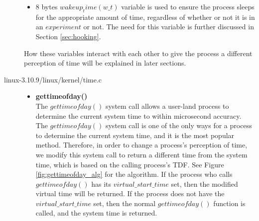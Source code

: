 \begin{description}
\begin{itemize}
	\item 8 bytes $wakeup_time (w\_t)$ variable is used to ensure the process sleeps for the appropriate amount of time, regardless of whether or not it is in an $experiment$ or not. The need for this variable is further discussed in Section \ref{sec:hooking}.
        \end{itemize}
        How these variables interact with each other to give the process a different perception of time will be explained in later sections. 
\item[linux-3.10.9/linux/kernel/time.c] \hfill 
        \begin{itemize} 
                        \item \textbf{gettimeofday()} \\
                        The $gettimeofday()$ system call allows a user-land process to determine the current system time to within microsecond accuracy. The $gettimeofday()$ system call is one of the only ways for a process to determine the current system time, and it is the most popular method. Therefore, in order to change a process's perception of time, we modify this system call to return a different time from the system time, which is based on the calling process's TDF. See Figure \ref{fig:gettimeofday_alg} for the algorithm. If the process who calls $gettimeofday()$ has its $virtual\_start\_time$ set, then the modified virtual time will be returned. If the process does not have the $virtual\_start\_time$ set, then the normal $gettimeofday()$ function is called, and the system time is returned. \\ \\

\end{itemize}
\end{description}
